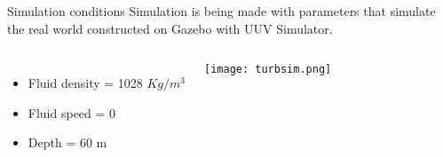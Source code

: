 \begin{frame}[t]{Simulation conditions}
  \transdissolve[duration=0.5]
  Simulation is being made with parameters that simulate the real world constructed on Gazebo with UUV Simulator.
  \begin{columns}[c]
      \begin{itemize}
        \item Fluid density = 1028 $Kg / m^3$
        \item Fluid speed = 0
        \item Depth = 60 m
      \end{itemize}      
      \texttt{[image: turbsim.png]}
  \end{columns}
\end{frame}


